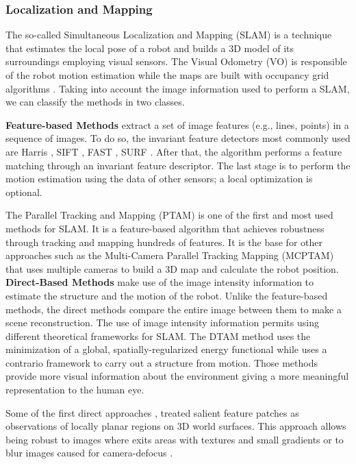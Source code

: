 \subsubsection{Localization and Mapping}
The so-called Simultaneous Localization and Mapping (SLAM) is a technique that estimates the local pose of a robot and builds a 3D model of its surroundings employing visual sensors. The Visual Odometry (VO) \cite{Scaramuzza.Fraundorfer:RAM:2011} is responsible of the robot motion estimation while the maps are built with occupancy grid algorithms \cite{Thrun.Bu:AI:1996}. Taking into account the image information used to perform a SLAM, we can classify the methods in two classes.

\textbf{Feature-based Methods} extract a set of image features (e.g., lines, points) in a sequence of images. To do so, the invariant feature detectors most commonly used are Harris \cite{Harris.Stephens:AVC:1988}, SIFT \cite{Lowe:ICCV:1999}, FAST \cite{Rosten.Drummond:ECCV:2006}, SURF \cite{Bay.Ess.ea:CVIU:2008}. After that, the algorithm performs a feature matching through an invariant feature descriptor. The last stage is to perform the motion estimation using the data of other sensors; a local optimization is optional. 

The Parallel Tracking and Mapping (PTAM) \cite{Klein.Murray:ISMAR:2007} is one of the first and most used methods for SLAM. It is a feature-based algorithm that achieves robustness through tracking and mapping hundreds of features. It is the base for other approaches such as the Multi-Camera Parallel Tracking Mapping (MCPTAM) \cite{Harmat.Trentini.ea:IROS:2015} that uses multiple cameras to build a 3D map and calculate the robot position. \\

\textbf{Direct-Based Methods} make use of the image intensity information to estimate the structure and the motion of the robot. Unlike the feature-based methods, the direct methods compare the entire image between them to make a scene reconstruction. The use of image intensity information permits using different theoretical frameworks for SLAM. The DTAM method \cite{Newcombe.Lovegrove.ea:ICCV:2011} uses the minimization of a global, spatially-regularized energy functional while \cite{Moulon.Monasse.ea:ACCV:2012} uses a contrario framework to carry out a structure from motion.
Those methods provide more visual information about the environment giving a more meaningful representation to the human eye. 

Some of the first direct approaches \cite{Jin.Favaro.ea:VC:2003}, \cite{Molton.Davison.ea:BMVC:2004} treated salient feature patches as observations of locally planar regions on 3D world surfaces. This approach allows being robust to images where exits areas with textures and small gradients \cite{Lovegrove.Davison.ea:IVS:2011} or to blur images caused for camera-defocus \cite{Newcombe.Lovegrove.ea:ICCV:2011}.\\

